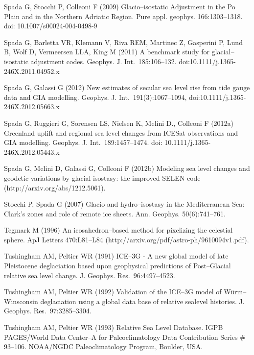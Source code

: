 \documentclass[11pt,fleqn,a4paper,titlepage]{article}
\newcommand\jgr{J. Geophys. Res.~}
\newcommand\gji{Geophys. J. Int.~}
\begin{document}
\begin{thebibliography}{99}
Spada G, Stocchi P, Colleoni F (2009)
Glacio--isostatic Adjustment in the Po Plain and in the Northern Adriatic Region.
Pure appl. geophys. 166:1303--1318. doi: 10.1007/s00024-004-0498-9

Spada G, Barletta VR, Klemann V, Riva REM, Martinec Z, Gasperini P, 
Lund B, Wolf D, Vermeersen LLA, King M (2011) A 
benchmark study for glacial--isostatic adjustment codes. \gji 185:106--132. 
doi:10.1111/j.1365-246X.2011.04952.x

Spada G, Galassi G (2012)
New estimates of secular sea level rise from tide gauge data and GIA modelling.
\gji 191(3):1067--1094, doi:10.1111/j.1365-246X.2012.05663.x

Spada G, Ruggieri G, Sorensen LS, Nielsen K, Melini D., Colleoni F (2012a) 
Greenland uplift and regional sea level changes from ICESat observations and GIA modelling.
\gji {189}:1457--1474. doi: 10.1111/j.1365-246X.2012.05443.x

Spada G, Melini D, Galassi G, Colleoni F (2012b) 
Modeling sea level changes and geodetic variations by glacial isostasy: the improved SELEN code  
(http://arxiv.org/abs/1212.5061). 

Stocchi P, Spada G (2007)    
Glacio and hydro--isostasy in the Mediterranean Sea: Clark's zones and role of remote ice sheets.
Ann. Geophys. 50(6):741--761. 

Tegmark M (1996)  
An icosahedron--based method for pixelizing the celestial sphere.  
ApJ Letters 470:L81--L84 (http://arxiv.org/pdf/astro-ph/9610094v1.pdf). 

Tushingham AM, Peltier  WR (1991) 
ICE--3G - A new global model of late Pleistocene deglaciation based upon geophysical predictions 
of Post--Glacial relative sea level change.
\jgr 96:4497--4523. 

Tushingham AM, Peltier WR (1992) 
Validation of the ICE--3G model of W\"urm--Winsconsin deglaciation using a global data base of relative sealevel histories. 
\jgr 97:3285--3304. 

Tushingham AM, Peltier WR (1993)   
Relative Sea Level Database. IGPB PAGES/World Data Center--A
for Paleoclimatology Data Contribution Series \# 93--106. 
NOAA/NGDC Paleoclimatology Program, Boulder, USA. 


\end{thebibliography}
\end{document}
